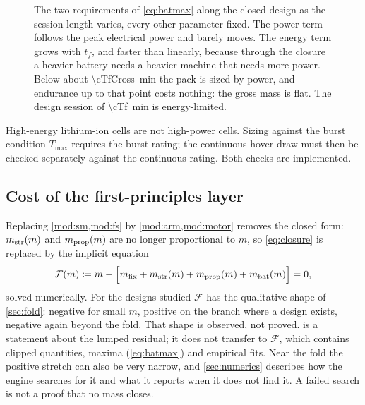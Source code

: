 \begin{figure}[tbp]
\centering

\caption{The two requirements of \cref{eq:batmax} along the closed design as
the session length varies, every other parameter fixed. The power term follows
the peak electrical power and barely moves. The energy term grows with $t_f$,
and faster than linearly, because through the closure a heavier battery needs a
heavier machine that needs more power. Below about \SI{\cTfCross}{\minute} the
pack is sized by power, and endurance up to that point costs nothing: the gross
mass is flat. The design session of \SI{\cTf}{\minute} is energy-limited.}
\label{fig:batmax}
\end{figure}

High-energy lithium-ion cells are not high-power cells. Sizing against the
burst condition $T_{\max}$ requires the burst rating; the continuous hover draw
must then be checked separately against the continuous rating. Both checks are
implemented.

\subsection{Cost of the first-principles layer}

Replacing \cref{mod:sm,mod:fs} by \cref{mod:arm,mod:motor} removes the closed
form: $m_{\mathrm{str}}(m)$ and $m_{\mathrm{prop}}(m)$ are no longer proportional to $m$, so
\cref{eq:closure} is replaced by the implicit equation
\begin{equation}
  \mathcal{F}(m) \coloneqq m - \Big[m_{\mathrm{fix}} + m_{\mathrm{str}}(m) + m_{\mathrm{prop}}(m) + m_{\mathrm{bat}}(m)\Big]
  = 0 ,
  \label{eq:fpclosure}
\end{equation}
solved numerically. For the designs studied $\mathcal{F}$ has the qualitative
shape of \cref{sec:fold}: negative for small $m$, positive on the branch where a
design exists, negative again beyond the fold. That shape is observed, not
proved.  is a statement about the lumped residual; it does
not transfer to $\mathcal{F}$, which contains clipped quantities, maxima
(\cref{eq:batmax}) and empirical fits. Near the fold the positive stretch can
also be very narrow, and \cref{sec:numerics} describes how the engine searches
for it and what it reports when it does not find it. A failed search is not a
proof that no mass closes.
